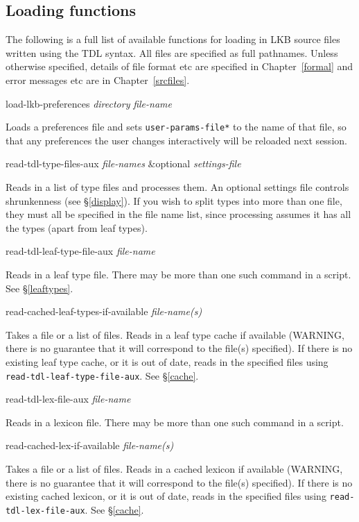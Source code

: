\documentclass[12pt]{report}
\newcommand{\lispcommand}[1]{\noindent\rm #1}%
\newcommand{\filename}[1]{{\tt #1}}
\newcommand{\functionname}[1]{{\tt #1}}
\begin{document}
\subsection{Loading functions}
\label{loadfns}

The following is a full list of available functions for loading
in LKB source files written using the TDL syntax.  All files
are specified as full pathnames.  Unless otherwise
specified, details of file format etc are 
specified in Chapter~\ref{formal} and error messages
etc are in Chapter~\ref{srcfiles}.

\lispcommand{load-lkb-preferences {\it directory} {\it file-name}}

Loads a preferences file and sets \filename{*user-params-file*}
to the name of that file, so that any preferences the user
changes interactively will be reloaded next session.

\lispcommand{read-tdl-type-files-aux {\it file-names} \&optional 
{\it settings-file}}

Reads in a list of type files and processes
them.  An optional settings file 
controls shrunkenness (see \S\ref{display}).
If you wish to split types into more than one file, they 
must all be specified in the file name list, since processing 
assumes it has all the types (apart from leaf types).

\lispcommand{read-tdl-leaf-type-file-aux {\it file-name}}

Reads in a leaf type file.  There may be more than one such command
in a script.
See \S\ref{leaftypes}.

\lispcommand{read-cached-leaf-types-if-available {\it file-name(s)}}

Takes a file or a list of files.
Reads in a leaf type cache if available (WARNING, there is no
guarantee that it will correspond to the file(s) specified).
If there is no existing leaf type cache, or it is out of date,
reads in the specified files 
using \functionname{read-tdl-leaf-type-file-aux}.
See \S\ref{cache}.

\lispcommand{read-tdl-lex-file-aux {\it file-name}}

Reads in a lexicon file. There may be more than one such command
in a script.

\lispcommand{read-cached-lex-if-available {\it file-name(s)}}

Takes a file or a list of files.
Reads in a cached lexicon if available (WARNING, there is no
guarantee that it will correspond to the file(s) specified).
If there is no existing cached lexicon, or it is out of date,
reads in the specified files using \functionname{read-tdl-lex-file-aux}.
See \S\ref{cache}.
\end{document}
